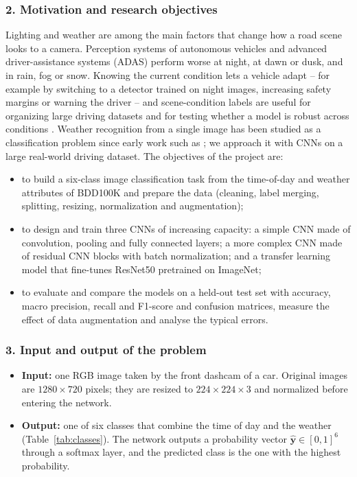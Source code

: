 \documentclass[12pt,letterpaper]{article}
\begin{document}
\subsubsection{2. Motivation and research objectives}
Lighting and weather are among the main factors that change how a road scene looks to a camera. Perception systems of
autonomous vehicles and advanced driver-assistance systems (ADAS) perform worse at night, at dawn or dusk, and in
rain, fog or snow. Knowing the current condition lets a vehicle adapt -- for example by switching to a detector
trained on night images, increasing safety margins or warning the driver -- and scene-condition labels are useful for
organizing large driving datasets and for testing whether a model is robust across conditions \cite{yu2020}. Weather
recognition from a single image has been studied as a classification problem since early work such as
\cite{lu2014}; we approach it with CNNs on a large real-world driving dataset. The objectives of the project are:
\begin{itemize}
  \item to build a six-class image classification task from the time-of-day and weather attributes of BDD100K and
        prepare the data (cleaning, label merging, splitting, resizing, normalization and augmentation);
  \item to design and train three CNNs of increasing capacity: a simple CNN made of convolution, pooling and fully
        connected layers; a more complex CNN made of residual CNN blocks with batch normalization; and a transfer
        learning model that fine-tunes ResNet50 pretrained on ImageNet;
  \item to evaluate and compare the models on a held-out test set with accuracy, macro precision, recall and F1-score
        and confusion matrices, measure the effect of data augmentation and analyse the typical errors.
\end{itemize}

\subsubsection{3. Input and output of the problem}
\begin{itemize}
  \item \textbf{Input:} one RGB image taken by the front dashcam of a car. Original images are $1280\times720$
        pixels; they are resized to $224\times224\times3$ and normalized before entering the network.
  \item \textbf{Output:} one of six classes that combine the time of day and the weather (Table~\ref{tab:classes}).
        The network outputs a probability vector $\hat{\symbf y}\in[0,1]^6$ through a softmax layer, and the
        predicted class is the one with the highest probability.
\end{itemize}
\end{document}
